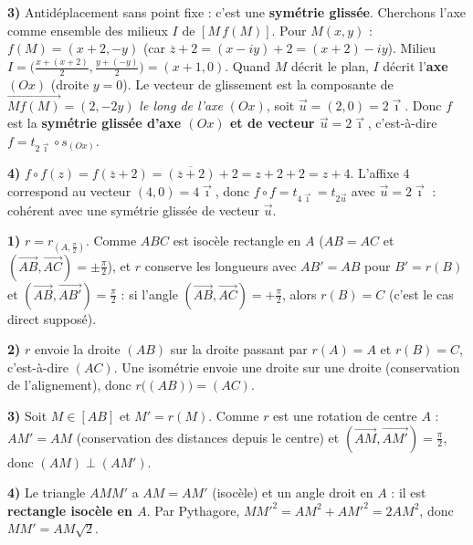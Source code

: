 \textbf{3)} Antidéplacement sans point fixe : c'est une \textbf{symétrie glissée}. Cherchons l'axe comme ensemble des milieux $I$ de $[M\,f(M)]$. Pour $M(x,y)$ : $f(M)=(x+2,-y)$ (car $\overline z+2 = (x-iy)+2=(x+2)-iy$). Milieu $I=\big(\tfrac{x+(x+2)}2,\tfrac{y+(-y)}2\big)=(x+1,0)$. Quand $M$ décrit le plan, $I$ décrit l'\textbf{axe} $(Ox)$ (droite $y=0$). Le vecteur de glissement est la composante de $\overrightarrow{M f(M)}=(2,-2y)$ \emph{le long de l'axe} $(Ox)$, soit $\vec u=(2,0)=2\vec\imath$. Donc $f$ est la \textbf{symétrie glissée d'axe $(Ox)$ et de vecteur $\vec u=2\vec\imath$}, c'est-à-dire $f=t_{2\vec\imath}\circ s_{(Ox)}$.

\textbf{4)} $f\circ f(z)=f(\overline z+2)=\overline{(\overline z+2)}+2=z+2+2=z+4$. L'affixe $4$ correspond au vecteur $(4,0)=4\vec\imath$, donc $f\circ f=t_{4\vec\imath}=t_{2\vec u}$ avec $\vec u=2\vec\imath$ : cohérent avec une symétrie glissée de vecteur $\vec u$.

\textbf{1)} $r=r_{(A,\frac\pi2)}$. Comme $ABC$ est isocèle rectangle en $A$ ($AB=AC$ et $(\overrightarrow{AB},\overrightarrow{AC})=\pm\frac\pi2$), et $r$ conserve les longueurs avec $AB'=AB$ pour $B'=r(B)$ et $(\overrightarrow{AB},\overrightarrow{AB'})=\frac\pi2$ : si l'angle $(\overrightarrow{AB},\overrightarrow{AC})=+\frac\pi2$, alors $r(B)=C$ (c'est le cas direct supposé).

\textbf{2)} $r$ envoie la droite $(AB)$ sur la droite passant par $r(A)=A$ et $r(B)=C$, c'est-à-dire $(AC)$. Une isométrie envoie une droite sur une droite (conservation de l'alignement), donc $r\big((AB)\big)=(AC)$.

\textbf{3)} Soit $M\in[AB]$ et $M'=r(M)$. Comme $r$ est une rotation de centre $A$ : $AM'=AM$ (conservation des distances depuis le centre) et $(\overrightarrow{AM},\overrightarrow{AM'})=\frac\pi2$, donc $(AM)\perp(AM')$.

\textbf{4)} Le triangle $AMM'$ a $AM=AM'$ (isocèle) et un angle droit en $A$ : il est \textbf{rectangle isocèle en $A$}. Par Pythagore, $MM'^2=AM^2+AM'^2=2AM^2$, donc $MM'=AM\sqrt2$.

